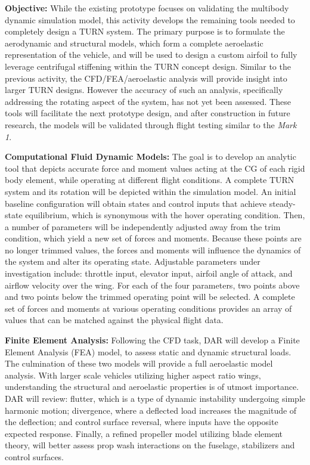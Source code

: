 \documentclass[11pt]{article}
\begin{document}
{\color{green} \bf Objective:}
While the existing prototype focuses on validating the multibody dynamic simulation model, this activity develops the remaining tools needed to completely design a TURN system.  The primary purpose is to formulate the aerodynamic and structural models, which form a complete aeroelastic representation of the vehicle, and will be used to design a custom airfoil to fully leverage centrifugal stiffening within the TURN concept design.  Similar to the previous activity, the CFD/FEA/aeroelastic analysis will provide insight into larger TURN designs.  However the accuracy of such an analysis, specifically addressing the rotating aspect of the system, has not yet been assessed.  These tools will facilitate the next prototype design, and after construction in future research, the models will be validated through flight testing similar to the \emph{Mark 1}.


{\color{green} \bf Computational Fluid Dynamic Models:}
The goal is to develop an analytic tool that depicts accurate force and moment values acting at the CG of each rigid body element, while operating at different flight conditions.  A complete TURN system and its rotation will be depicted within the simulation model.  An initial baseline configuration will obtain states and control inputs that achieve steady-state equilibrium, which is synonymous with the hover operating condition.  Then, a number of parameters will be independently adjusted away from the trim condition, which yield a new set of forces and moments.  Because these points are no longer trimmed values, the forces and moments will influence the dynamics of the system and alter its operating state.  Adjustable parameters under investigation include: throttle input, elevator input, airfoil angle of attack, and airflow velocity over the wing.  For each of the four parameters, two points above and two points below the trimmed operating point will be selected.  A complete set of forces and moments at various operating conditions provides an array of values that can be matched against the physical flight data.


{\color{green} \bf Finite Element Analysis:}
Following the CFD task, DAR will develop a Finite Element Analysis (FEA) model, to assess static and dynamic structural loads.  The culmination of these two models will provide a full aeroelastic model analysis.  With larger scale vehicles utilizing higher aspect ratio wings, understanding the structural and aeroelastic properties is of utmost importance.  DAR will review: flutter, which is a type of dynamic instability undergoing simple harmonic motion; divergence, where a deflected load increases the magnitude of the deflection; and control surface reversal, where inputs have the opposite expected response.  Finally, a refined propeller model utilizing blade element theory, will better assess prop wash interactions on the fuselage, stabilizers and control surfaces.
\end{document}
